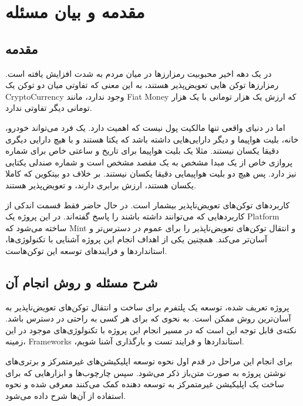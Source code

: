 
\chapter{مقدمه و بیان مسئله}

\section{مقدمه}
در یک دهه اخیر محبوبیت رمزارز‌ها در میان مردم به شدت افزایش یافته است.
رمزارزها توکن هایی تعویض‌پذیر هستند، به این معنی که تفاوتی میان دو توکن یک
\gls{CryptoCurrency}
وجود ندارد، مانند
\gls{Fiat Money}
که ارزش یک هزار تومانی با یک هزار تومانی دیگر تفاوتی ندارد.

اما در دنیای واقعی تنها مالکیت پول نیست که اهمیت دارد.
یک فرد می‌تواند خودرو، خانه، بلیت هواپیما و دیگر دارایی‌هایی داشته باشد که یکتا هستند و
با هیچ دارایی دیگری دقیقا یکسان نیستند.
مثلا یک بلیت هواپیما برای تاریخ و ساعتی خاص برای شماره پروازی خاص از یک مبدا مشخص به یک مقصد مشخص است و
شماره صندلی یکتایی نیز دارد.
پس هیچ دو بلیت هواپیمایی دقیقا یکسان نیستند.
بر خلاف دو بیتکوین که کاملا یکسان هستند، ارزش برابری دارند، و تعویض‌پذیر هستند.

کاربردهای توکن‌های تعویض‌ناپذیر بیشمار است.
در حال حاضر فقط قسمت اندکی از کاربردهایی که می‌توانند داشته باشند را پاسخ گفته‌اند.
در این پروژه یک
\gls{Platform}
ساخته می‌شود که
\gls{Mint}
و انتقال توکن‌های تعویض‌ناپذیر را برای عموم در دسترس‌تر و آسان‌تر می‌کند.
همچنین یکی از اهداف انجام این پروژه آشنایی با تکنولوژی‌ها، استاندارد‌ها و فرایند‌های توسعه این توکن‌هاست.


\section{شرح مسئله و روش انجام آن}
پروژه تعریف شده،
توسعه یک پلتفرم برای ساخت و انتقال توکن‌های تعویض‌ناپذیر به آسان‌ترین روش ممکن است.
به نحوی که برای هر کسی به راحتی در دسترس باشد.
نکته‌ی قابل توجه‌ این است که در مسیر انجام این پروژه با تکنولوژی‌های موجود در این زمینه، 
\glspl{Framework}
،استاندارد‌ها و فرایند تست و بارگذاری آشنا شویم.

برای انجام این مراحل در قدم اول نحوه توسعه اپلیکیشن‌های غیرمتمرکز و
برتری‌های نوشتن پروژه به صورت متن‌باز ذکر می‌شود.
سپس چارچوب‌ها و ابزار‌هایی که برای ساخت یک اپلیکیشن غیرمتمرکز به توسعه دهنده کمک می‌کنند معرفی شده
و نحوه استفاده از آن‌ها شرح داده می‌شود.

